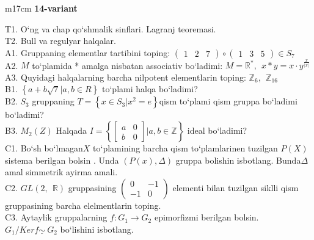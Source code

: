 \documentclass{article}
\begin{document}
\begin{tabular}{m{17cm}}
\textbf{14-variant}
\newline

T1. O`ng va chap qo`shmalik sinflari. Lagranj teoremasi. \\
T2. Bull va regulyar halqalar. \\
A1. Gruppaning elementlar tartibini toping: \(\begin{pmatrix}
1 & 2 & 7
\end{pmatrix} \circ \begin{pmatrix}
1 & 3 & 5
\end{pmatrix} \in S_{7}\) \\
A2. \(M\) to`plamida * amalga nisbatan associativ bo`ladimi: \(M = \mathbb{R}^{*},\ \ x*y = x \cdot y^{\frac{x}{|x|}}\) \\
A3. Quyidagi halqalarning barcha nilpotent elementlarin toping: \(\mathbb{Z}_{6},\ \ \mathbb{Z}_{16}\) \\
B1. \(\left\{ a + b\sqrt{7}|a,b \in R \right\}\) to`plami halqa bo`ladimi? \\
B2. \(S_{3}\) gruppaning \(T = \left\{ x \in S_{3}|x^{2} = e \right\}\)qism to`plami qism gruppa bo`ladimi bo`ladimi? \\
B3. \(M_{2}(Z)\) Halqada \(I = \left\{ \begin{bmatrix}
a & 0 \\
b & 0
\end{bmatrix}|a,b\mathbb{\in Z} \right\}\) ideal bo`ladimi? \\
C1. Bo`sh bo`lmagan\(X\) to`plamining barcha qism to`plamlarinen tuzilgan \(P(X)\) sistema berilgan bo\textquotesingle lsin . Unda \((P(x),\Delta)\) gruppa bolishin isbotlang. Bunda\(\Delta\) amal simmetrik ayirma amali. \\
C2. \(GL(2,\mathbb{\ \ R})\) gruppasining \(\begin{pmatrix}
0 & - 1 \\
 - 1 & 0
\end{pmatrix}\) elementi bilan tuzilgan siklli qism gruppasining barcha elelmentlarin toping. \\
C3. Aytaylik gruppalarning \(f:G_{1} \rightarrow G_{2}\) epimorfizmi berilgan bo\textquotesingle lsin. \(G_{1}/Kerf\underline{\sim}\ G_{2}\) bo`lishini isbotlang. \\

\end{tabular}
\vspace{1cm}
\end{document}
